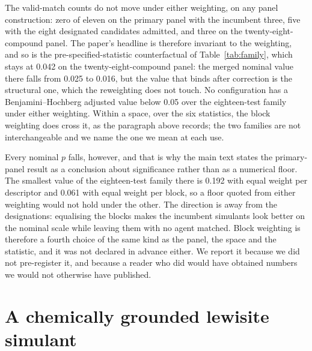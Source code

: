 \documentclass[11pt,a4paper]{article}
\begin{document}
The valid-match counts do not move under either weighting, on any panel
construction: zero of eleven on the primary panel with the incumbent three,
five with the eight designated candidates admitted, and three on the
twenty-eight-compound panel. The paper's headline is therefore invariant to
the weighting, and
so is the pre-specified-statistic counterfactual of Table~\ref{tab:family},
which stays at 0.042 on the twenty-eight-compound panel: the merged nominal value
there falls from 0.025 to 0.016, but the value that binds after correction is the
structural one, which the reweighting does not touch. No configuration has a
Benjamini--Hochberg adjusted value below 0.05 over the eighteen-test family
under either weighting. Within a space, over the six statistics, the block
weighting does cross it, as the paragraph above records; the two families are
not interchangeable and we name the one we mean at each use.

Every nominal $p$ falls, however, and that is why the main text states the
primary-panel result as a conclusion about significance rather than as a
numerical floor. The smallest value of the eighteen-test family there is 0.192
with equal weight per descriptor and 0.061 with equal weight per block, so a
floor quoted from either weighting would not hold under the other. The direction
is away from the designations: equalising the blocks makes the incumbent
simulants look better on the nominal scale while leaving them with no agent
matched. Block weighting is therefore a fourth choice of the same kind as the
panel, the space and the statistic, and it was not declared in advance either.
We report it because we did not pre-register it, and because a reader who did
would have obtained numbers we would not otherwise have published.

\section{A chemically grounded lewisite simulant}
\label{sec:si-ascl3}
\end{document}
